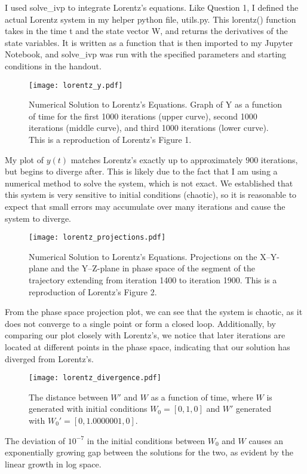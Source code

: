 \documentclass{article}
\begin{document}
I used solve\_ivp to integrate Lorentz's equations. Like Question 1, I defined the actual Lorentz system in my helper python file, utils.py. This lorentz() function takes in the time t and the state vector W, and returns the derivatives of the state variables. It is written as a function that is then imported to my Jupyter Notebook, and solve\_ivp was run with the specified parameters and starting conditions in the handout.

\begin{figure}[h]
    \centering
    \texttt{[image: lorentz\_y.pdf]}
    \caption{Numerical Solution to Lorentz's Equations. Graph of Y as a function of time for the first 1000 iterations (upper curve), second 1000 iterations (middle curve), and third 1000 iterations (lower curve). This is a reproduction of Lorentz's Figure 1.
}
\end{figure}
My plot of $y(t)$ matches Lorentz's exactly up to approximately $900$ iterations, but begins to diverge after. This is likely due to the fact that I am using a numerical method to solve the system, which is not exact. We established that this system is very sensitive to initial conditions (chaotic), so it is reasonable to expect that small errors may accumulate over many iterations and cause the system to diverge. 


\begin{figure}[h]
    \centering
    \texttt{[image: lorentz\_projections.pdf]}
    \caption{Numerical Solution to Lorentz's Equations. Projections on the X–Y-plane and the Y–Z-plane in phase space of the segment of the trajectory extending from iteration 1400 to iteration 1900. This is a reproduction of Lorentz's Figure 2.
}
\end{figure}

From the phase space projection plot, we can see that the system is chaotic, as it does not converge to a single point or form a closed loop.
Additionally, by comparing our plot closely with Lorentz's, we notice that later iterations are located at different points in the phase space, indicating that our solution has diverged from Lorentz's.

\begin{figure}[h]
    \centering
    \texttt{[image: lorentz\_divergence.pdf]}
    \caption{The distance between $W'$ and $W$ as a function of time, where $W$ is generated with initial conditions $W_0 = [0,1,0]$ and $W'$ generated with $W_0' = [0,1.0000001, 0]$.
}
\end{figure}
The deviation of $10^{-7}$ in the initial conditions between $W_0$ and $W$ causes an exponentially growing gap between the solutions for the two, as evident by the linear growth in log space.
\end{document}
